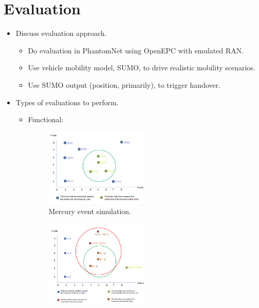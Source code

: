 \section{Evaluation}

\begin{itemize}
\item Discuss evaluation approach.
  \begin{itemize}
  \item Do evaluation in PhantomNet using OpenEPC with emulated RAN.
  \item Use vehicle mobility model, SUMO, to drive realistic mobility scenarios.
  \item Use SUMO output (position, primarily), to trigger handover.
  \end{itemize}
\item Types of evaluations to perform.
  \begin{itemize}
  \item Functional:
  \begin{figure}[ht]
   \begin{center}
    \includegraphics[width=0.5\textwidth]{figs/simulated.png}
    \caption{Mercury event simulation.}
    \label{fig:simulated}
   \end{center}
  \end{figure}
  \begin{figure}[ht]
   \begin{center}
    \includegraphics[width=0.5\textwidth]{figs/aoi.png}

\end{center}
\end{figure}
\end{itemize}
\end{itemize}
